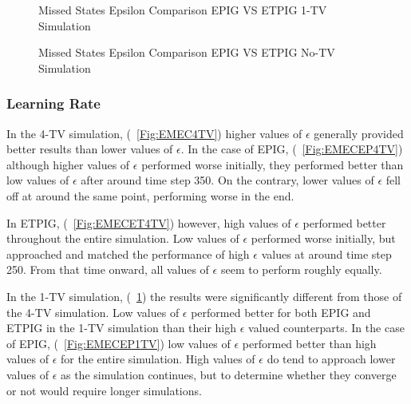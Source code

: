 \documentclass[letterpaper]{article} %
\begin{document}
\begin{figure}
	\begin{center}
		\hfill
		\hfill
	\end{center}
	\caption{Missed States Epsilon Comparison EPIG VS ETPIG 1-TV Simulation}
	\label{Fig:EMEC1TV}
\end{figure}

\begin{figure}
	\begin{center}
		\hfill
			
		\hfill
	\end{center}
	\caption{Missed States Epsilon Comparison EPIG VS ETPIG No-TV Simulation}
	\label{Fig:EMEC0TV}
\end{figure}

\subsubsection{Learning Rate}
In the 4-TV simulation, (\figurename~\ref{Fig:EMEC4TV}) higher values of $\epsilon$ generally provided better results than lower values of $\epsilon$. In the case of EPIG, (\figurename~\ref{Fig:EMECEP4TV}) although higher values of $\epsilon$ performed worse initially, they performed better than low values of $\epsilon$ after around time step 350. On the contrary, lower values of $\epsilon$ fell off at around the same point, performing worse in the end.

In ETPIG, (\figurename~\ref{Fig:EMECET4TV}) however, high values of $\epsilon$ performed better throughout the entire simulation. Low values of $\epsilon$ performed worse initially, but approached and matched the performance of high $\epsilon$ values at around time step 250. From that time onward, all values of $\epsilon$ seem to perform roughly equally.

In the 1-TV simulation, (\figurename~\ref{Fig:EMEC1TV}) the results were significantly different from those of the 4-TV simulation. Low values of $\epsilon$ performed better for both EPIG and ETPIG in the 1-TV simulation than their high $\epsilon$ valued counterparts. In the case of EPIG, (\figurename~\ref{Fig:EMECEP1TV}) low values of $\epsilon$ performed better than high values of $\epsilon$ for the entire simulation. High values of $\epsilon$ do tend to approach lower values of $\epsilon$ as the simulation continues, but to determine whether they converge or not would require longer simulations.
\end{document}
